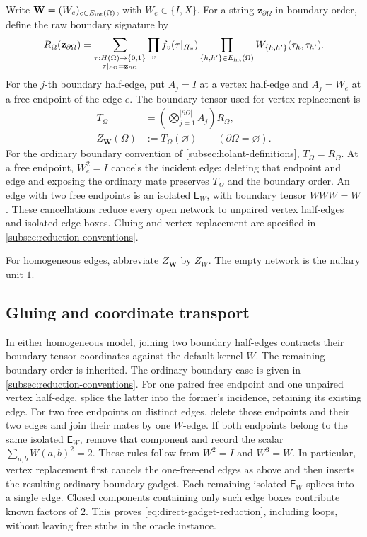 \documentclass[11pt,letterpaper,onecolumn]{article}
\theoremstyle{plain}
\theoremstyle{definition}
\theoremstyle{remark}
\begin{document}
Write \(\mathbf W=(W_e)_{e\in E_{\rm int}(\Omega)}\), with
\(W_e\in\{I,X\}\).  For a string \({\mathbf z}_{\partial\Omega}\) in boundary
order, define the raw boundary signature by
\[
 R_\Omega({\mathbf z}_{\partial\Omega})
 =\sum_{\substack{\tau:H(\Omega)\to\{0,1\}\\\tau|_{\partial\Omega}={\mathbf z}_{\partial\Omega}}}
    \prod_v f_v(\tau|_{H_v})
    \prod_{\{h,h'\}\in E_{\rm int}(\Omega)}W_{\{h,h'\}}(\tau_h,\tau_{h'}).
\]
For the \(j\)-th boundary half-edge, put \(A_j=I\) at a vertex half-edge and
\(A_j=W_e\) at a free endpoint of the edge \(e\).  The boundary tensor used
for vertex replacement is
\begin{align}
 T_\Omega&=\left(\bigotimes_{j=1}^{|\partial\Omega|}A_j\right)R_\Omega,
       \label{eq:half-edge-boundary-tensor}\\
 Z_{\mathbf W}(\Omega)&:=T_\Omega(\varnothing)
   \qquad(\partial\Omega=\varnothing).
 \label{eq:half-edge-partition-function}
\end{align}
For the ordinary boundary convention of
\cref{subsec:holant-definitions}, \(T_\Omega=R_\Omega\).
At a free endpoint, \(W_e^2=I\) cancels the incident edge: deleting that
endpoint and edge and exposing the ordinary mate preserves \(T_\Omega\)
and the boundary order.  An edge with two free endpoints is an isolated
\(\mathsf E_W\), with boundary tensor \(WWW=W\).  These cancellations
reduce every open network to unpaired vertex half-edges and isolated edge
boxes.  Gluing and vertex replacement are specified in
\cref{subsec:reduction-conventions}.

For homogeneous edges, abbreviate \(Z_{\mathbf W}\) by \(Z_W\).
The empty network is the nullary unit \(1\).

\subsection{Gluing and coordinate transport}
In either homogeneous model, joining two boundary half-edges contracts their
boundary-tensor coordinates against the default kernel \(W\). The remaining
boundary order is inherited.  The ordinary-boundary case is given in
\cref{subsec:reduction-conventions}. For one paired free endpoint and one
unpaired vertex half-edge,
splice the latter into the former's incidence, retaining its existing edge.
For two free endpoints on distinct edges, delete those endpoints and their
two edges and join their mates by one \(W\)-edge.  If both endpoints belong
to the same isolated \(\mathsf E_W\), remove that component and record the
scalar \(\sum_{a,b}W(a,b)^2=2\).  These rules follow from \(W^2=I\) and
\(W^3=W\).  In particular, vertex replacement first cancels the one-free-end
edges as above and then inserts the resulting ordinary-boundary gadget.
Each remaining isolated \(\mathsf E_W\) splices into a single edge.
Closed components containing only such edge boxes contribute known factors
of \(2\).  This proves \cref{eq:direct-gadget-reduction}, including loops,
without leaving free stubs in the oracle instance.
\end{document}
